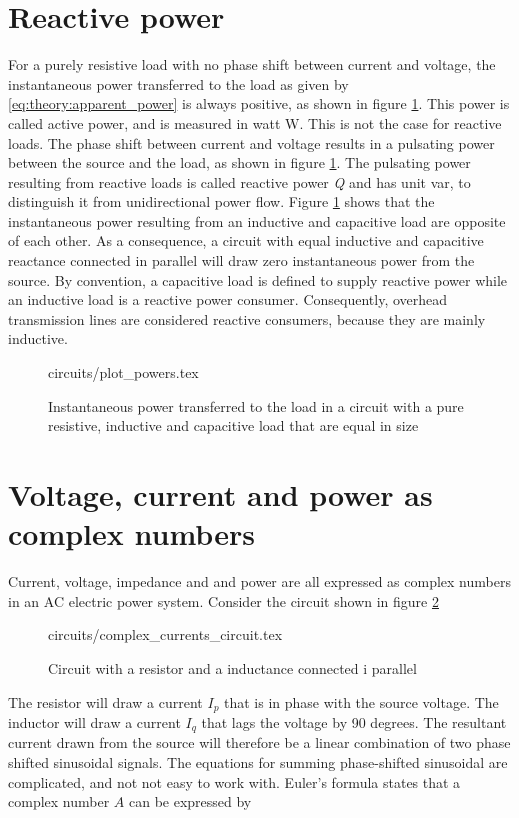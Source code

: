 \documentclass[class=book, crop=false]{standalone}
\begin{document}
\section{Reactive power}
For a purely resistive load with no phase shift between current and voltage, the instantaneous power transferred to the load as given by \eqref{eq:theory:apparent_power} is always positive, as shown in figure \ref{fig:theory:reactive_powers}. This power is called active power, and is measured in watt W. This is not the case for reactive loads. The phase shift between current and voltage results in a pulsating power between the source and the load, as shown in figure \ref{fig:theory:reactive_powers}. The pulsating power resulting from reactive loads is called reactive power \textit{Q} and has unit var, to distinguish it from unidirectional power flow. Figure \ref{fig:theory:reactive_powers} shows that the instantaneous power resulting from an inductive and capacitive load are opposite of each other. As a consequence, a circuit with equal inductive and capacitive reactance connected in parallel will draw zero instantaneous power from the source. By convention, a capacitive load is defined to supply reactive power while an inductive load is a reactive power consumer. Consequently, overhead transmission lines are considered reactive consumers, because they are mainly inductive. 

\begin{figure}[ht!]
    \center
    {circuits/plot_powers.tex}
    \caption[size = 9]
    {Instantaneous power transferred to the load in a circuit with a pure resistive, inductive and capacitive load that are equal in size}\label{fig:theory:reactive_powers}
\end{figure}


\section{Voltage, current and power as complex numbers}

Current, voltage, impedance and and power are all expressed as complex numbers in an AC electric power system. Consider the circuit shown in figure \ref{fig:theory:complex_current_circuit}
\begin{figure}[ht!]
    \center
    {circuits/complex_currents_circuit.tex}
    \caption[size = 9]
    {Circuit with a resistor and a inductance connected i parallel}\label{fig:theory:complex_current_circuit}
\end{figure}
The resistor will draw a current $I_{p}$ that is in phase with the source voltage. The inductor will draw a current $I_{q}$ that lags the voltage by 90 degrees. The resultant current drawn from the source will therefore be a linear combination of two phase shifted sinusoidal signals. The equations for summing phase-shifted sinusoidal are complicated, and not not easy to work with. Euler's formula states that a complex number $A$ can be expressed by
\end{document}
